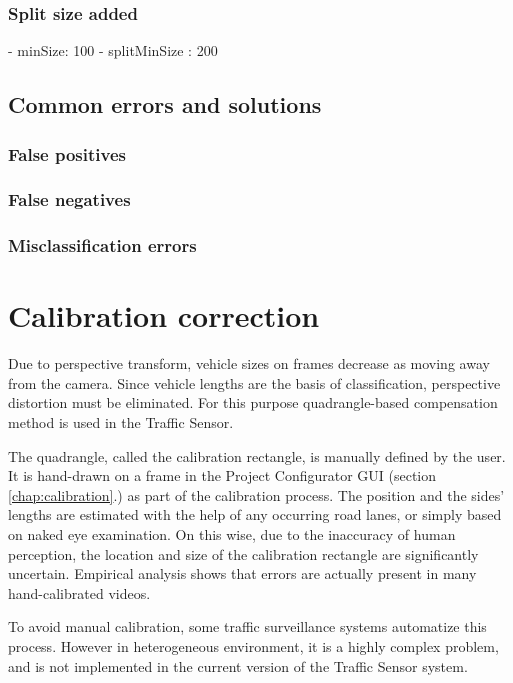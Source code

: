 \subsubsection{Split size added}
- minSize: 100
- splitMinSize : 200

\subsection{Common errors and solutions}
\subsubsection{False positives}
\subsubsection{False negatives}
\subsubsection{Misclassification errors}

\section{Calibration correction}\label{chap:cal_corr}
Due to perspective transform, vehicle sizes on frames decrease as moving away from the camera.
Since vehicle lengths are the basis of classification, perspective distortion must be eliminated.
For this purpose quadrangle-based compensation method is used in the Traffic Sensor.

The quadrangle, called the calibration rectangle, is manually defined by the user.
It is hand-drawn on a frame in the Project Configurator GUI (section \ref{chap:calibration}.) as part of the calibration process.
The position and the sides' lengths are estimated with the help of any occurring road lanes, or simply based on naked eye examination.
On this wise, due to the inaccuracy of human perception, the location and size of the calibration rectangle are significantly uncertain.
Empirical analysis shows that errors are actually present in many hand-calibrated videos.

To avoid manual calibration, some traffic surveillance systems automatize this process.
However in heterogeneous environment, it is a highly complex problem, and is not implemented in the current version of the Traffic Sensor system.

